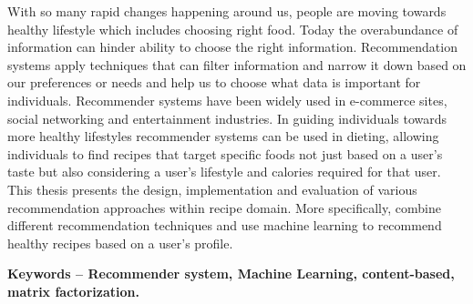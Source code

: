 



\vspace{1mm}

\normalsize
\noindent With so many rapid changes happening around us, people are moving towards healthy lifestyle which includes choosing right food. Today the overabundance of information can hinder ability to choose the right information. Recommendation systems apply techniques that can filter information and narrow it down based on our preferences or needs and help us to choose what data is important for individuals. Recommender systems have been widely used in e-commerce sites, social networking and entertainment industries. In guiding individuals towards more healthy lifestyles recommender systems can be used in dieting, allowing individuals to find recipes that target specific foods not just based on a user's taste but also considering a user's lifestyle and calories required for that user. This thesis presents the design, implementation and evaluation of various recommendation approaches within recipe domain. More specifically, combine different recommendation techniques and use machine learning to recommend healthy recipes based on a user's profile.

\vspace*{\fill}
\noindent \textbf{Keywords – Recommender system, Machine Learning, content-based, matrix factorization.}




